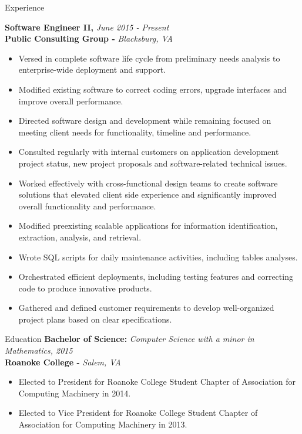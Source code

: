 \documentclass{resume} %
\begin{document}
\begin{rSection}{Experience}

{\bf Software Engineer II, }{\em June 2015 - Present} 
\\
{\bf Public Consulting Group -  }{\em Blacksburg, VA}
\begin{itemize}
\item Versed in complete software life cycle from preliminary needs analysis to enterprise-wide deployment and support.
\item Modified existing software to correct coding errors, upgrade interfaces and improve overall performance.
\item Directed software design and development while remaining focused on meeting client needs for functionality, timeline and performance.
\item Consulted regularly with internal customers on application development project status, new project proposals and software-related technical issues.
\item Worked effectively with cross-functional design teams to create software solutions that elevated client side experience and significantly improved overall functionality and performance.
\item Modified preexisting scalable applications for information identification, extraction, analysis, and retrieval.
\item Wrote SQL scripts for daily maintenance activities, including tables analyses.
\item Orchestrated efficient deployments, including testing features and correcting code to produce innovative products.
\item Gathered and defined customer requirements to develop well-organized project plans based on clear specifications.
\end{itemize}
\end{rSection}

\begin{rSection}{Education}
{\bf Bachelor of Science: }{\em Computer Science with a minor in Mathematics, 2015} 
\\
{\bf Roanoke College -  }{\em Salem, VA}
\begin{itemize}
\item Elected to President for Roanoke College Student Chapter of Association for Computing Machinery in 2014.
\item Elected to Vice President for Roanoke College Student Chapter of Association for Computing Machinery in 2013.
\end{itemize}
\end{rSection}
\end{document}
